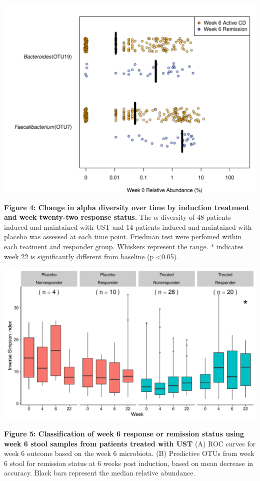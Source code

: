 \documentclass[12pt,]{article}
\begin{document}
\includegraphics{figures/Figure3_basesigOTUabund.REMISSwk6.pdf}

\newpage

\textbf{Figure 4: Change in alpha diversity over time by induction
treatment and week twenty-two response status.} The
\({\alpha}\)-diversity of 48 patients induced and maintained with UST
and 14 patients induced and maintained with placebo was assessed at each
time point. Friedman test were perfomed within each teatment and
responder group. Whiskers represent the range. * indicates week 22 is
significantly different from baseline (p \textless{}0.05).

\includegraphics{figures/Figure4_alltp.adivXvisitXindtrtXrelRSPwk22.pdf}

\newpage

\textbf{Figure 5: Classification of week 6 response or remission status
using week 6 stool samples from patients treated with UST} (A) ROC
curves for week 6 outcome based on the week 6 microbiota. (B) Predictive
OTUs from week 6 stool for remission status at 6 weeks post induction,
based on mean decrease in accuracy. Black bars represent the median
relative abundance.
\end{document}
